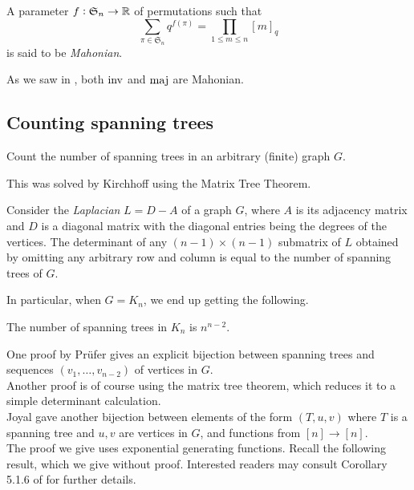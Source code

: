 	\begin{definition}
		A parameter $f : \mathfrak{S}_n \to \mathbb{R}$ of permutations such that
		\[ \sum_{\pi \in \mathfrak{S}_n} q^{f(\pi)} = \prod_{1 \le m \le n} [m]_q \]
		is said to be \emph{Mahonian}.
	\end{definition}

	As we saw in , both $\operatorname{inv}$ and $\operatorname{maj}$ are Mahonian.

\subsection{Counting spanning trees}

	\begin{problem*}
		Count the number of spanning trees in an arbitrary (finite) graph $G$.
	\end{problem*}

	This was solved by Kirchhoff using the Matrix Tree Theorem.
	
	\begin{ftheo}
		Consider the \emph{Laplacian} $L = D-A$ of a graph $G$, where $A$ is its adjacency matrix and $D$ is a diagonal matrix with the diagonal entries being the degrees of the vertices. The determinant of any $(n-1)\times(n-1)$ submatrix of $L$ obtained by omitting any arbitrary row and column is equal to the number of spanning trees of $G$.
	\end{ftheo}


	In particular, when $G = K_n$, we end up getting the following.

	\begin{ftheo}
		\label{theo: cayleys theorem}
		The number of spanning trees in $K_n$ is $n^{n-2}$.
	\end{ftheo}
	One proof by Pr\"{u}fer gives an explicit bijection between spanning trees and sequences $(v_1,\ldots,v_{n-2})$ of vertices in $G$.\\
	Another proof is of course using the matrix tree theorem, which reduces it to a simple determinant calculation.\\
	Joyal gave another bijection between elements of the form $(T,u,v)$ where $T$ is a spanning tree and $u,v$ are vertices in $G$, and functions from $[n] \to [n]$.\\

	The proof we give uses exponential generating functions. Recall the following result, which we give without proof. Interested readers may consult Corollary 5.1.6 of \cite{ec2} for further details.

